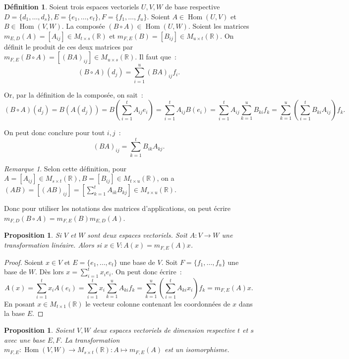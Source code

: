 \documentclass{article}
\DeclareMathOperator{\Hom}{Hom}
\newcommand{\R}{\mathbb R}
\newcommand{\M}[3]{M_{#1 \times #2}(#3)}
\newtheorem{prp}[thm]{Proposition}
\theoremstyle{definition}
\newtheorem{déf}[thm]{Définition}
\theoremstyle{remark}
\newtheorem*{rmq}{Remarque}
\begin{document}
		\begin{déf} Soient trois espaces vectoriels $U, V, W$ de base respective $D = \{d_1, \dotsc, d_s\}, E = \{e_1, \dotsc, e_t\}, F = \{f_1, \dotsc, f_u\}$.
		Soient $A \in \Hom(U, V)$ et $B \in \Hom(V, W)$. La composée $(B \circ A) \in \Hom(U, W)$. Soient les matrices $m_{E, D}(A) = [A_{ij}] \in \M ts\R$ et
		$m_{F, E}(B) = [B_{ij}] \in \M ut\R$. On définit le produit de ces deux matrices par $m_{F, E}(B \circ A) = [(BA)_{ij}] \in \M us\R$. Il faut que~:
		\[(B \circ A)(d_j) = \sum_{i=1}^u(BA)_{ij}f_i. \]
		
		Or, par la définition de la composée, on sait~:
		\[(B \circ A)(d_j) = B(A(d_j)) = B\left(\sum_{i=1}^tA_{ij}e_i\right) = \sum_{i=1}^tA_{ij}B(e_i)
		                   = \sum_{i=1}^tA_{ij}\sum_{k=1}^uB_{ki}f_k = \sum_{k=1}^u\left(\sum_{i=1}^tB_{ki}A_{ij}\right)f_k.\]
		
		On peut donc conclure pour tout $i, j$~: \[(BA)_{ij} = \sum_{k=1}^tB_{ik}A_{kj}.\] \end{déf}

		\begin{rmq} Selon cette définition, pour $A = [A_{ij}] \in \M st\R, B = [B_{ij}] \in \M tu\R$, on a
		$(AB) = [(AB)_{ij}] = \left[\sum_{k=1}^tA_{ik}B_{kj}\right] \in \M su\R$.
		
		Donc pour utiliser les notations des matrices d'applications, on peut écrire $m_{F, D}(B \circ A) = m_{F, E}(B)m_{E, D}(A)$. \end{rmq}

		\begin{prp} Si $V$ et $W$ sont deux espaces vectoriels. Soit $A : V \to W$ une transformation linéaire. Alors si $x \in V : A(x) = m_{F, E}(A)x$. \end{prp}

		\begin{proof} Soient $x \in V$ et $E = \{e_1, \dotsc, e_t\}$ une base de $V$. Soit $F = \{f_1, \dotsc, f_u\}$ une base de $W$. Dès lors
		$x = \sum_{i=1}^tx_ie_i$. On peut donc écrire~:
		\[A(x) = \sum_{i=1}^tx_iA(e_i) = \sum_{i=1}^tx_i\sum_{k=1}^uA_{ki}f_k = \sum_{k=1}^u\left(\sum_{i=1}^tA_{ki}x_i\right)f_k = m_{F, E}(A)x.\]
		En posant $x \in \M t1\R$ le vecteur colonne contenant les coordonnées de $x$ dans la base $E$. \end{proof}

		\begin{prp} Soient $V, W$ deux espaces vectoriels de dimension respective $t$ et $s$ avec une base $E, F$. La transformation
		$m_{F, E} : \Hom(V, W) \to \M st\R : A \mapsto m_{F, E}(A)$ est un isomorphisme. \end{prp}
\end{document}
